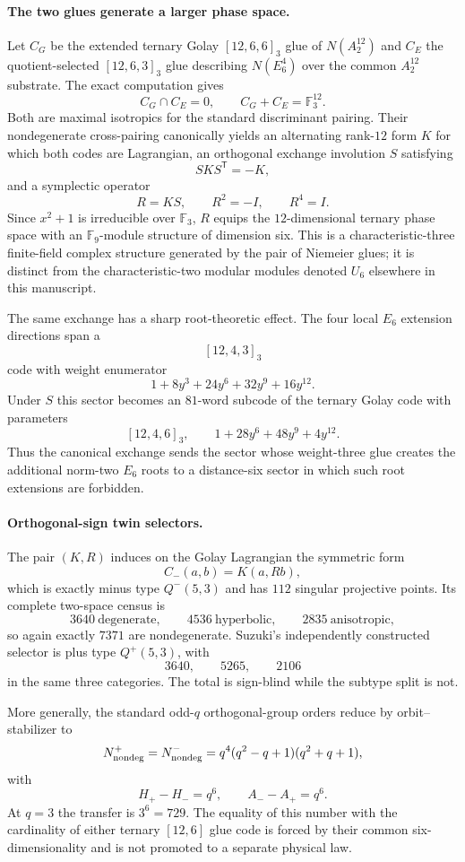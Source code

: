 \paragraph{The two glues generate a larger phase space.}
Let $C_G$ be the extended ternary Golay $[12,6,6]_3$ glue of $N(A_2^{12})$ and $C_E$ the quotient-selected $[12,6,3]_3$ glue describing $N(E_6^4)$ over the common $A_2^{12}$ substrate.  The exact computation gives
\[
 C_G\cap C_E=0,
 \qquad
 C_G+C_E=\mathbb F_3^{12}.
\]
Both are maximal isotropics for the standard discriminant pairing.  Their nondegenerate cross-pairing canonically yields an alternating rank-$12$ form $K$ for which both codes are Lagrangian, an orthogonal exchange involution $S$ satisfying
\[
 SKS^{\mathsf T}=-K,
\]
and a symplectic operator
\[
 R=KS,
 \qquad R^2=-I,
 \qquad R^4=I.
\]
Since $x^2+1$ is irreducible over $\mathbb F_3$, $R$ equips the $12$-dimensional ternary phase space with an $\mathbb F_9$-module structure of dimension six.  This is a characteristic-three finite-field complex structure generated by the pair of Niemeier glues; it is distinct from the characteristic-two modular modules denoted $U_6$ elsewhere in this manuscript.

The same exchange has a sharp root-theoretic effect.  The four local $E_6$ extension directions span a
\[
[12,4,3]_3
\]
code with weight enumerator
\[
1+8y^3+24y^6+32y^9+16y^{12}.
\]
Under $S$ this sector becomes an $81$-word subcode of the ternary Golay code with parameters
\[
[12,4,6]_3,
\qquad
1+28y^6+48y^9+4y^{12}.
\]
Thus the canonical exchange sends the sector whose weight-three glue creates the additional norm-two $E_6$ roots to a distance-six sector in which such root extensions are forbidden.

\paragraph{Orthogonal-sign twin selectors.}
The pair $(K,R)$ induces on the Golay Lagrangian the symmetric form
\[
 C_-(a,b)=K(a,Rb),
\]
which is exactly minus type $Q^-(5,3)$ and has $112$ singular projective points.  Its complete two-space census is
\[
3640\ \text{degenerate},\qquad
4536\ \text{hyperbolic},\qquad
2835\ \text{anisotropic},
\]
so again exactly $7371$ are nondegenerate.  Suzuki's independently constructed selector is plus type $Q^+(5,3)$, with
\[
3640,\qquad 5265,\qquad 2106
\]
in the same three categories.  The total is sign-blind while the subtype split is not.

More generally, the standard odd-$q$ orthogonal-group orders reduce by orbit--stabilizer to
\[
N_{\rm nondeg}^{+}=N_{\rm nondeg}^{-}
 =q^4(q^2-q+1)(q^2+q+1),
\]
with
\[
H_+-H_-=q^6,
\qquad
A_--A_+=q^6.
\]
At $q=3$ the transfer is $3^6=729$.  The equality of this number with the cardinality of either ternary $[12,6]$ glue code is forced by their common six-dimensionality and is not promoted to a separate physical law.


